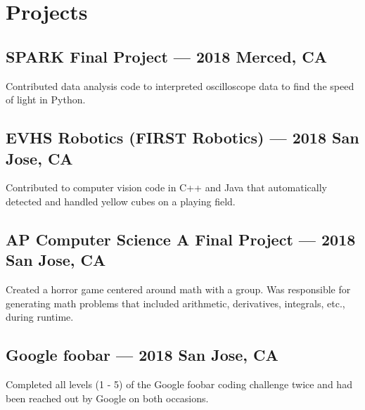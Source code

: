 \documentclass[./Resume.tex]{subfiles}
\begin{document}
\section{Projects}
	\subsection{SPARK Final Project --- 2018 \null\hfill Merced, CA}
	\par Contributed data analysis code to interpreted oscilloscope data to find the speed of light in Python.
	\vspace*{-2mm}
	\subsection{EVHS Robotics (FIRST Robotics) --- 2018 \null\hfill San Jose, CA}
	\par Contributed to computer vision code in C++ and Java that automatically detected and handled yellow cubes on a playing field.
	\vspace*{-2mm}
	\subsection{AP Computer Science A Final Project --- 2018 \null\hfill San Jose, CA}
	\par Created a horror game centered around math with a group. Was responsible for generating math problems that included arithmetic, derivatives, integrals, etc., during runtime.
	\vspace*{-2mm}
	\subsection{Google foobar --- 2018 \null\hfill San Jose, CA}
	\par Completed all levels (1 - 5) of the Google foobar coding challenge twice and had been reached out by Google on both occasions.
\end{document}
